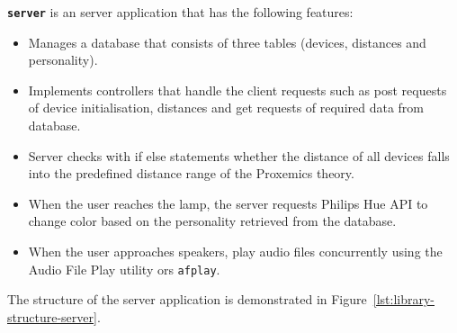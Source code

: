 \textbf{\texttt{server}} is an server application that has the following features:
\begin{itemize}
    \item Manages a database that consists of three tables (devices, distances and personality).
    \item Implements controllers that handle the client requests such as post requests of device initialisation,
    distances and get requests of required data from database.
    \item Server checks with if else statements whether the distance of all devices falls into the predefined distance range of the Proxemics theory.
    \item When the user reaches the lamp, the server requests Philips Hue API to change color based on the personality retrieved from the database.
    \item When the user approaches speakers, play audio files concurrently using the Audio File Play
    utility ors \texttt{afplay}.
\end{itemize}

The structure of the server application is demonstrated in Figure~\ref{lst:library-structure-server}.

